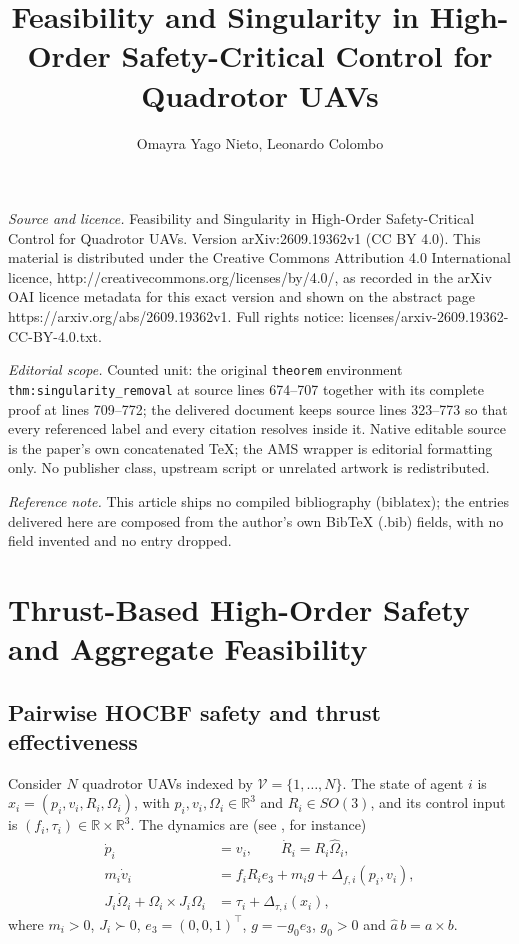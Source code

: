 \documentclass[10pt,a4paper]{amsart}
\begin{document}
\title[Feasibility and Singularity in High-Order Safety-Critical Co]{Feasibility and Singularity in High-Order Safety-Critical Control for Quadrotor UAVs}
\author{Omayra Yago Nieto, Leonardo Colombo}
\date{}
\maketitle
\noindent\emph{Source and licence.} Feasibility and Singularity in High-Order Safety-Critical Control for Quadrotor UAVs. Version arXiv:2609.19362v1 (CC BY 4.0). This material is distributed under the Creative Commons Attribution 4.0 International licence, http://creativecommons.org/licenses/by/4.0/, as recorded in the arXiv OAI licence metadata for this exact version and shown on the abstract page https://arxiv.org/abs/2609.19362v1. Full rights notice: licenses/arxiv-2609.19362-CC-BY-4.0.txt.\par\smallskip
\noindent\textit{Editorial scope.} Counted unit: the original \texttt{theorem} environment \texttt{thm:singularity\_removal} at source lines 674--707 together with its complete proof at lines 709--772; the delivered document keeps source lines 323--773 so that every referenced label and every citation resolves inside it. Native editable source is the paper's own concatenated TeX; the AMS wrapper is editorial formatting only. No publisher class, upstream script or unrelated artwork is redistributed.
\par\smallskip\noindent\textit{Reference note.} This article ships no compiled bibliography (biblatex); the entries delivered here are composed from the author's own BibTeX (.bib) fields, with no field invented and no entry dropped.
\section{Thrust-Based High-Order Safety and Aggregate Feasibility}\label{secII}

\subsection{Pairwise HOCBF safety and thrust effectiveness}

Consider $N$ quadrotor UAVs indexed by
$\mathcal V=\{1,\ldots,N\}$. The state of agent $i$ is
$x_i=(p_i,v_i,R_i,\Omega_i)$, with $p_i,v_i,\Omega_i\in
\mathbb R^3$ and $R_i\in SO(3)$, and its control input is
$(f_i,\tau_i)\in\mathbb R\times\mathbb R^3$. The dynamics are (see \cite{lee2010geometric}, for instance)
\begin{align}
    \dot p_i &=v_i,\qquad
    \dot R_i=R_i\widehat{\Omega}_i,                         \label{eq:quad_kin}\\
    m_i\dot v_i
    &=f_iR_ie_3+m_i g+\Delta_{f,i}(p_i,v_i),                    \label{eq:quad_trans}\\
    J_i\dot\Omega_i+\Omega_i\times J_i\Omega_i
    &=\tau_i+\Delta_{\tau,i}(x_i),                          \label{eq:quad_rot}
\end{align}
where $m_i>0$, $J_i\succ0$, $e_3=(0,0,1)^\top$,
$g=-g_0e_3$, \(g_0>0\) and $\widehat a\,b=a\times b$.
\end{document}
